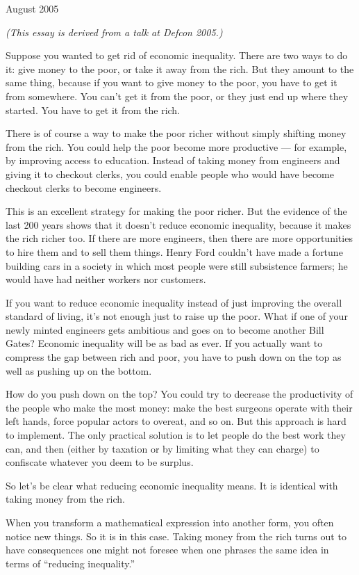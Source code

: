 \documentclass[12pt]{book}
\begin{document}
August 2005

\emph{(This essay is derived from a talk at Defcon 2005.)}

Suppose you wanted to get rid of economic inequality. There are two ways
to do it: give money to the poor, or take it away from the rich. But
they amount to the same thing, because if you want to give money to the
poor, you have to get it from somewhere. You can't get it from the poor,
or they just end up where they started. You have to get it from the
rich.

There is of course a way to make the poor richer without simply shifting
money from the rich. You could help the poor become more productive ---
for example, by improving access to education. Instead of taking money
from engineers and giving it to checkout clerks, you could enable people
who would have become checkout clerks to become engineers.

This is an excellent strategy for making the poor richer. But the
evidence of the last 200 years shows that it doesn't reduce economic
inequality, because it makes the rich richer too. If there are more
engineers, then there are more opportunities to hire them and to sell
them things. Henry Ford couldn't have made a fortune building cars in a
society in which most people were still subsistence farmers; he would
have had neither workers nor customers.

If you want to reduce economic inequality instead of just improving the
overall standard of living, it's not enough just to raise up the poor.
What if one of your newly minted engineers gets ambitious and goes on to
become another Bill Gates? Economic inequality will be as bad as ever.
If you actually want to compress the gap between rich and poor, you have
to push down on the top as well as pushing up on the bottom.

How do you push down on the top? You could try to decrease the
productivity of the people who make the most money: make the best
surgeons operate with their left hands, force popular actors to overeat,
and so on. But this approach is hard to implement. The only practical
solution is to let people do the best work they can, and then (either by
taxation or by limiting what they can charge) to confiscate whatever you
deem to be surplus.

So let's be clear what reducing economic inequality means. It is
identical with taking money from the rich.

When you transform a mathematical expression into another form, you
often notice new things. So it is in this case. Taking money from the
rich turns out to have consequences one might not foresee when one
phrases the same idea in terms of ``reducing inequality.''
\end{document}
